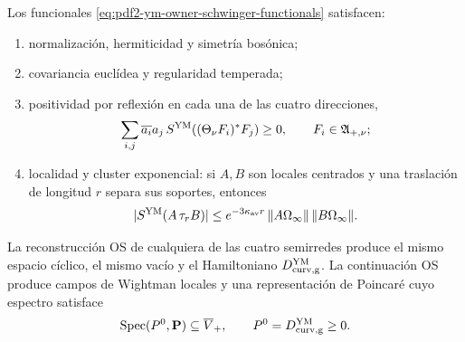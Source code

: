 \begin{proposition}
\label{prop:pdf2-ym-owner-continuum-os-package}
Los funcionales \eqref{eq:pdf2-ym-owner-schwinger-functionals} satisfacen:
\begin{enumerate}
 \item normalización, hermiticidad y simetría bosónica;
 \item covariancia euclídea y regularidad temperada;
 \item positividad por reflexión en cada una de las cuatro direcciones,
 \begin{equation}\label{eq:pdf2-ym-owner-continuum-reflection-positive}
  \sum_{i,j}\overline{a_i}a_j\,
  S^{\rm YM}\!\left((\Theta_\nu F_i)^*F_j\right)\ge0,
  \qquad F_i\in\mathfrak A_{+,\nu};
 \end{equation}
 \item localidad y cluster exponencial: si $A,B$ son locales centrados y una
 traslación de longitud $r$ separa sus soportes, entonces
 \begin{equation}\label{eq:pdf2-ym-owner-continuum-cluster}
  |S^{\rm YM}(A\,\tau_rB)|
  \le e^{-3\kappa_{\rm av}r}\,
       \|A\Omega_\infty\|\,\|B\Omega_\infty\|.
 \end{equation}
\end{enumerate}
La reconstrucción OS de cualquiera de las cuatro semirredes produce el mismo
espacio cíclico, el mismo vacío y el Hamiltoniano
$D_{\rm curv,g}^{\rm YM}$. La continuación OS produce campos de Wightman locales y una
representación de Poincaré cuyo espectro satisface
\begin{equation}\label{eq:pdf2-ym-owner-wightman-spectrum}
 \operatorname{Spec}(P^0,\mathbf P)\subseteq\overline V_+,
 \qquad P^0=D_{\rm curv,g}^{\rm YM}\ge0.
\end{equation}
\end{proposition}

